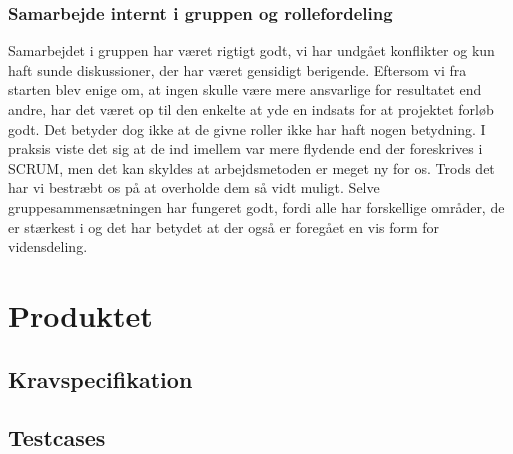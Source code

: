 \documentclass[12pt, a4paper]{report}
\begin{document}
\subsection{Samarbejde internt i gruppen og rollefordeling}
Samarbejdet i gruppen har været rigtigt godt, vi har undgået konflikter og kun haft sunde diskussioner, der har været gensidigt berigende. Eftersom vi fra starten blev enige om, at ingen skulle være mere ansvarlige for resultatet end andre, har det været op til den enkelte at yde en indsats for at projektet forløb godt.
Det betyder dog ikke at de givne roller ikke har haft nogen betydning. I praksis viste det sig at de ind imellem var mere flydende end der foreskrives i SCRUM, men det kan skyldes at arbejdsmetoden er meget ny for os. Trods det har vi bestræbt os på at overholde dem så vidt muligt. Selve gruppesammensætningen har fungeret godt, fordi alle har forskellige områder, de er stærkest i og det har betydet at der også er foregået en vis form for vidensdeling.

\chapter{Produktet}
\section{Kravspecifikation}

\section{Testcases}
\end{document}
